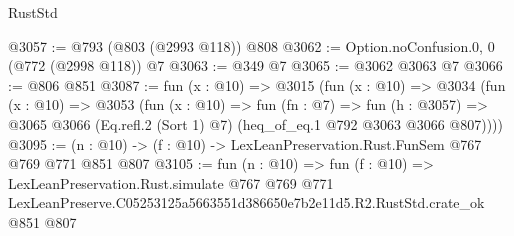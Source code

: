 \begin{lexlean}{RustStd}
\begin{coremodule}
@3057 := @793 (@803 (@2993 @118)) @808
@3062 := Option.noConfusion.{0, 0} (@772 (@2998 @118)) @7
@3063 := @349 @7
@3065 := @3062 @3063 @7
@3066 := @806 @851
@3087 := fun (x : @10) =>
  @3015
    (fun (x : @10) =>
    @3034
      (fun (x : @10) =>
      @3053
        (fun (x : @10) =>
        fun (fn : @7) =>
        fun (h : @3057) =>
        @3065 @3066 (Eq.refl.{2} (Sort 1) @7) (heq_of_eq.{1} @792 @3063 @3066 @807))))
@3095 := (n : @10) -> (f : @10) -> LexLeanPreservation.Rust.FunSem @767 @769 @771 @851 @807
@3105 := fun (n : @10) =>
  fun (f : @10) =>
  LexLeanPreservation.Rust.simulate
    @767
    @769
    @771
    LexLeanPreserve.C05253125a5663551d386650e7b2e11d5.R2.RustStd.crate_ok
    @851
    @807
\end{coremodule}
\end{lexlean}
